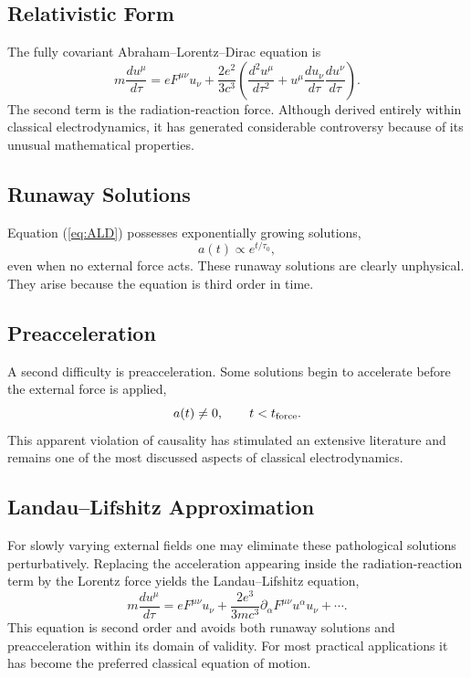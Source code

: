 \subsection{Relativistic Form}
The fully covariant Abraham--Lorentz--Dirac equation is
\begin{equation}
m\frac{du^\mu}{d\tau}=eF^{\mu\nu}u_\nu+\frac{2e^2}{3c^3}
\left(\frac{d^2u^\mu}{d\tau^2}+u^\mu\frac{du_\nu}{d\tau}\frac{du^\nu}{d\tau}\right).
\label{eq:ALD}
\end{equation}
The second term is the radiation-reaction force.
Although derived entirely within classical electrodynamics, it has
generated considerable controversy because of its unusual mathematical
properties.
\subsection{Runaway Solutions}
Equation (\ref{eq:ALD}) possesses exponentially growing solutions,
\[a(t)\propto e^{t/\tau_0},\]
even when no external force acts.
These runaway solutions are clearly unphysical.
They arise because the equation is third order in time.
\subsection{Preacceleration}
A second difficulty is preacceleration.
Some solutions begin to accelerate before the external force is applied,
\[a(t)\neq0,\qquad t<t_{\rm force}.\]
This apparent violation of causality has stimulated an extensive
literature and remains one of the most discussed aspects of classical
electrodynamics.
\subsection{Landau--Lifshitz Approximation}
For slowly varying external fields one may eliminate these pathological
solutions perturbatively.
Replacing the acceleration appearing inside the radiation-reaction term
by the Lorentz force yields the Landau--Lifshitz equation,
\begin{equation}
m\frac{du^\mu}{d\tau}=eF^{\mu\nu}u_\nu+\frac{2e^3}{3mc^3}\partial_\alpha 
    F^{\mu\nu}u^\alpha u_\nu+\cdots .
\end{equation}
This equation is second order and avoids both runaway solutions and
preacceleration within its domain of validity.
For most practical applications it has become the preferred classical
equation of motion.
